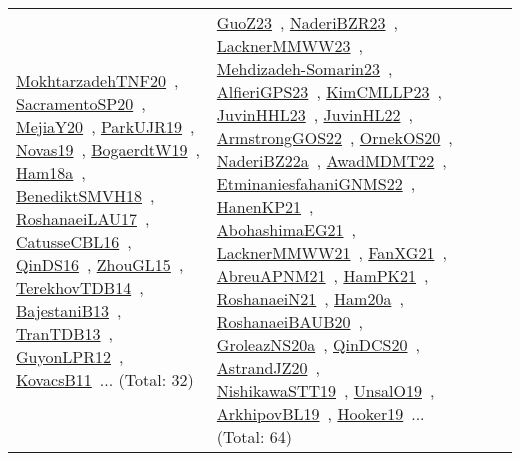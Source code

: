 {\begin{longtable}{lp{3cm}>{\raggedright\arraybackslash}p{6cm}>{\raggedright\arraybackslash}p{6cm}>{\raggedright\arraybackslash}p{8cm}}
\href{../works/MokhtarzadehTNF20.pdf}{MokhtarzadehTNF20}~\cite{MokhtarzadehTNF20}, \href{../works/SacramentoSP20.pdf}{SacramentoSP20}~\cite{SacramentoSP20}, \href{../works/MejiaY20.pdf}{MejiaY20}~\cite{MejiaY20}, \href{../works/ParkUJR19.pdf}{ParkUJR19}~\cite{ParkUJR19}, \href{../works/Novas19.pdf}{Novas19}~\cite{Novas19}, \href{../works/BogaerdtW19.pdf}{BogaerdtW19}~\cite{BogaerdtW19}, \href{../works/Ham18a.pdf}{Ham18a}~\cite{Ham18a}, \href{../works/BenediktSMVH18.pdf}{BenediktSMVH18}~\cite{BenediktSMVH18}, \href{../works/RoshanaeiLAU17.pdf}{RoshanaeiLAU17}~\cite{RoshanaeiLAU17}, \href{../works/CatusseCBL16.pdf}{CatusseCBL16}~\cite{CatusseCBL16}, \href{../works/QinDS16.pdf}{QinDS16}~\cite{QinDS16}, \href{../works/ZhouGL15.pdf}{ZhouGL15}~\cite{ZhouGL15}, \href{../works/TerekhovTDB14.pdf}{TerekhovTDB14}~\cite{TerekhovTDB14}, \href{../works/BajestaniB13.pdf}{BajestaniB13}~\cite{BajestaniB13}, \href{../works/TranTDB13.pdf}{TranTDB13}~\cite{TranTDB13}, \href{../works/GuyonLPR12.pdf}{GuyonLPR12}~\cite{GuyonLPR12}, \href{../works/KovacsB11.pdf}{KovacsB11}~\cite{KovacsB11}... (Total: 32) & \href{../works/GuoZ23.pdf}{GuoZ23}~\cite{GuoZ23}, \href{../works/NaderiBZR23.pdf}{NaderiBZR23}~\cite{NaderiBZR23}, \href{../works/LacknerMMWW23.pdf}{LacknerMMWW23}~\cite{LacknerMMWW23}, \href{../works/Mehdizadeh-Somarin23.pdf}{Mehdizadeh-Somarin23}~\cite{Mehdizadeh-Somarin23}, \href{../works/AlfieriGPS23.pdf}{AlfieriGPS23}~\cite{AlfieriGPS23}, \href{../works/KimCMLLP23.pdf}{KimCMLLP23}~\cite{KimCMLLP23}, \href{../works/JuvinHHL23.pdf}{JuvinHHL23}~\cite{JuvinHHL23}, \href{../works/JuvinHL22.pdf}{JuvinHL22}~\cite{JuvinHL22}, \href{../works/ArmstrongGOS22.pdf}{ArmstrongGOS22}~\cite{ArmstrongGOS22}, \href{../works/OrnekOS20.pdf}{OrnekOS20}~\cite{OrnekOS20}, \href{../works/NaderiBZ22a.pdf}{NaderiBZ22a}~\cite{NaderiBZ22a}, \href{../works/AwadMDMT22.pdf}{AwadMDMT22}~\cite{AwadMDMT22}, \href{../works/EtminaniesfahaniGNMS22.pdf}{EtminaniesfahaniGNMS22}~\cite{EtminaniesfahaniGNMS22}, \href{../works/HanenKP21.pdf}{HanenKP21}~\cite{HanenKP21}, \href{../works/AbohashimaEG21.pdf}{AbohashimaEG21}~\cite{AbohashimaEG21}, \href{../works/LacknerMMWW21.pdf}{LacknerMMWW21}~\cite{LacknerMMWW21}, \href{../works/FanXG21.pdf}{FanXG21}~\cite{FanXG21}, \href{../works/AbreuAPNM21.pdf}{AbreuAPNM21}~\cite{AbreuAPNM21}, \href{../works/HamPK21.pdf}{HamPK21}~\cite{HamPK21}, \href{../works/RoshanaeiN21.pdf}{RoshanaeiN21}~\cite{RoshanaeiN21}, \href{../works/Ham20a.pdf}{Ham20a}~\cite{Ham20a}, \href{../works/RoshanaeiBAUB20.pdf}{RoshanaeiBAUB20}~\cite{RoshanaeiBAUB20}, \href{../works/GroleazNS20a.pdf}{GroleazNS20a}~\cite{GroleazNS20a}, \href{../works/QinDCS20.pdf}{QinDCS20}~\cite{QinDCS20}, \href{../works/AstrandJZ20.pdf}{AstrandJZ20}~\cite{AstrandJZ20}, \href{../works/NishikawaSTT19.pdf}{NishikawaSTT19}~\cite{NishikawaSTT19}, \href{../works/UnsalO19.pdf}{UnsalO19}~\cite{UnsalO19}, \href{../works/ArkhipovBL19.pdf}{ArkhipovBL19}~\cite{ArkhipovBL19}, \href{../works/Hooker19.pdf}{Hooker19}~\cite{Hooker19}... (Total: 64)\\

\end{longtable}}
